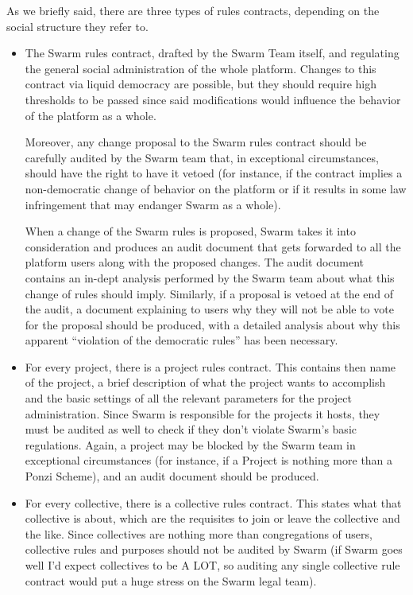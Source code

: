 \documentclass[submission, copyright,creativecommons,sharealike,noncommercial]{eptcs}
\begin{document}
		As we briefly said, there are three types of rules contracts, depending on the social structure they refer to.
		\begin{itemize}
			\item The Swarm rules contract, drafted by the Swarm Team itself, and regulating the general social administration of the whole platform. Changes to this contract via liquid democracy are possible, but they should require high thresholds to be passed since said modifications would influence the behavior of the platform as a whole.
			
			Moreover, any change proposal to the Swarm rules contract should be carefully audited by the Swarm team that, in exceptional circumstances, should have the right to have it vetoed (for instance, if the contract implies a non-democratic change of behavior on the platform or if it results in some law infringement that may endanger Swarm as a whole).
			
			When a change of the Swarm rules is proposed, Swarm takes it into consideration and produces an audit document that gets forwarded to all the platform users along with the proposed changes. The audit document contains an in-dept analysis performed by the Swarm team about what this change of rules should imply. Similarly, if a proposal is vetoed at the end of the audit, a document explaining to users why they will not be able to vote for the proposal should be produced, with a detailed analysis about why this apparent ``violation of the democratic rules'' has been necessary.
			
			\item For every project, there is a project rules contract. This contains then name of the project, a brief description of what the project wants to accomplish and the basic settings of all the relevant parameters for the project administration. Since Swarm is responsible for the projects it hosts, they must be audited as well to check if they don't violate Swarm's basic regulations. Again, a project may be blocked by the Swarm team in exceptional circumstances (for instance, if a Project is nothing more than a Ponzi Scheme), and an audit document should be produced.
			
			\item For every collective, there is a collective rules contract. This states what that collective is about, which are the requisites to join or leave the collective and the like. Since collectives are nothing more than congregations of users, collective rules and purposes should not be audited by Swarm (if Swarm goes well I'd expect collectives to be A LOT, so auditing any single collective rule contract would put a huge stress on the Swarm legal team).
		\end{itemize}
		
\end{document}
